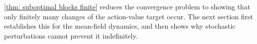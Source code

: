 % 
\autoref{thm: suboptimal blocks finite} reduces the convergence problem to showing that only finitely many changes of the action-value target occur. The next section first establishes this for the mean-field dynamics, and then shows why stochastic perturbations cannot prevent it indefinitely.
% 







